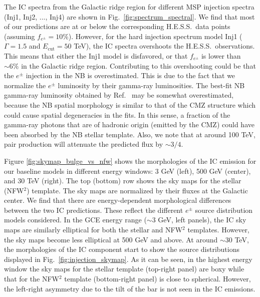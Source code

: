 \documentclass[doublespace,nopageskip]{VTthesis} %
\begin{document}
The IC spectra from the Galactic ridge region for different MSP injection spectra (Inj1, Inj2, ..., Inj4) are shown in Fig.~\ref{fig:spectrum_spectral}. We find that most of our predictions are at or below the corresponding H.E.S.S.~data points (assuming $f_{e^\pm} = 10\%$). However, for the hard injection spectrum model Inj1 ($\Gamma = 1.5$ and $E_{\text{cut}}=50$ TeV), the IC spectra overshoots the H.E.S.S.~observations. This means that either the Inj1 model is disfavored, or that $f_{e^\pm}$ is lower than $\sim 6\%$ in the Galactic ridge region. Contributing to this overshooting could be that the $e^\pm$ injection in the NB is overestimated. This is due to the fact that we normalize the $e^\pm$ luminosity by their gamma-ray luminosities. The best-fit NB gamma-ray luminosity obtained by Ref.~\cite{2018NatAs...2..387M} may be somewhat overestimated, because the NB spatial morphology is similar to that of the CMZ structure which could cause spatial degeneracies in the fits. In this sense, a fraction of the gamma-ray photons that are of hadronic origin (emitted by the CMZ) could have been absorbed by the NB stellar template. Also, we note that at around 100 TeV, pair production will attenuate the predicted flux by $\sim 3/4$.

Figure \ref{fig:skymap_bulge_vs_nfw} shows the morphologies of the IC emission for our baseline models in different energy windows: 3 GeV (left), 500 GeV (center), and 30 TeV (right). The top (bottom) row shows the sky maps for the stellar (NFW$^2$) template. The sky maps are normalized by their fluxes at the Galactic center. We find that there are energy-dependent morphological differences between the two IC predictions. These reflect the different $e^\pm$ source distribution models considered. In the GCE energy range ($\sim 3$ GeV, left panels), the IC sky maps are similarly elliptical for both the stellar and NFW$^2$ templates. However, the sky maps become less elliptical at 500 GeV and above. At around $\sim 30$ TeV, the morphologies of the IC component start to show the source distributions displayed in Fig.~\ref{fig:injection_skymap}. As it can be seen, in the highest energy window the sky maps for the stellar template (top-right panel) are boxy while that for the NFW$^2$ template (bottom-right panel) is close to spherical. However, the left-right asymmetry due to the tilt of the bar is not seen in the IC emissions.
\end{document}
